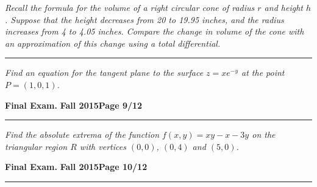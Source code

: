\documentclass[12pt]{article}
\begin{document}
\bigskip
{\problem[5 pts] \em Recall the formula for the volume of a right circular cone of radius $r$ and height $h$.  Suppose that the height decreases from 20 to 19.95 inches, and the radius increases from 4 to 4.05 inches.  Compare the change in volume of the cone with an approximation of this change using a total differential.}
\vspace{9cm}
\begin{flushright}
\end{flushright}
\hrule
{\problem[5 pts] \em Find an equation for the tangent plane to the surface $z=xe^{-y}$ at the point $P=(1,0,1)$.}
\vspace{4cm}
\begin{flushright}
\end{flushright}
\newpage

\hfill{\large\bf Final Exam.}\hfill{\large\bf
  Fall 2015}\hfill{\large\bf Page 9/12}\hrule

\bigskip
{\problem[5 pts] \em Find the absolute extrema of the function $f(x,y) = xy-x-3y$ on the triangular region $R$ with vertices $(0,0)$, $(0,4)$ and $(5,0)$.}
\vspace{18.5cm}
\begin{flushright}
\end{flushright}
\newpage


\hfill{\large\bf Final Exam.}\hfill{\large\bf
  Fall 2015}\hfill{\large\bf Page 10/12}\hrule
\end{document}
